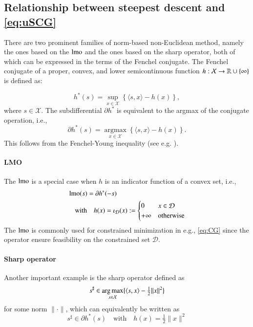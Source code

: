\subsection{Relationship between steepest descent and \ref{eq:uSCG}}\label{sec:fenchel}
There are two prominent families of norm-based non-Euclidean method, namely the ones based on the $\operatorname{lmo}$ and the ones based on the sharp operator, both of which can be expressed in the terms of the Fenchel conjugate.
The Fenchel conjugate of a proper, convex, and lower semicontinuous function $h: \mathcal X \to \mathbb{R} \cup \{\infty\}$ is defined as:

\begin{equation*}
h^*(s) = \sup_{x \in \mathcal X} \left\{ \langle s, x \rangle - h(x) \right\},
\end{equation*}
where $s \in \mathcal X$. 
The subdifferential $\partial h^*$ is equivalent to the argmax of the conjugate operation, i.e.,
\begin{equation*}
\partial h^*(s) = \operatorname*{argmax}_{x \in \mathcal X} \left\{ \langle s, x \rangle - h(x) \right\}.
\end{equation*}
This follows from the Fenchel-Young inequality (see e.g. \citet{bauschke2012fenchel}).

\paragraph{LMO}
The $\operatorname{lmo}$ is a special case when $h$ is an indicator function of a convex set, i.e.,
\begin{equation*}
\begin{split}
&\operatorname{lmo}(s) = \partial h^*(-s) \\
&\quad \text{with} \quad
h(x)=\iota_{\mathcal D}(x):=\begin{cases}0 &x \in \mathcal D \\ +\infty & \mathrm{otherwise}\end{cases}
\end{split}
\end{equation*}
The $\operatorname{lmo}$ is commonly used for constrained minimization in e.g., \ref{eq:CG} since the operator ensure feasibility on the constrained set $\mathcal D$.

\paragraph{Sharp operator}
Another important example is the sharp operator \citep{nesterov2012efficiency,kelner2014almost} defined as
\begin{equation*}
s^\sharp \in \operatorname*{arg\,max}_{x \in \mathcal X} \{ \braket{s,x} - \tfrac{1}{2}\|x\|^2 \}
\end{equation*}
for some norm $\|\cdot\|$, which can equivalently be written as
\begin{equation*}
s^\sharp \in \partial h^*(s)
\quad \text{with} \quad
h(x)=\tfrac{1}{2}\|x\|^2
\end{equation*}


